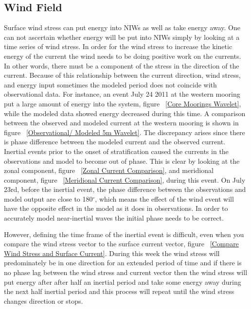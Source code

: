 \subsection{Wind Field}
Surface wind stress can put energy into NIWs as well as take energy away. One can not ascertain whether energy will be put into NIWs simply
by looking at a time series of wind stress. In order for the wind stress to increase the kinetic energy of the current the wind needs to be doing positive work on the currents. 
In other words, there must be a component of the stress in the direction of the current. Because of this relationship between the current direction, wind stress, and energy input sometimes 
the modeled period does not coincide with observational data. For instance, an event July 24 2011 at the western mooring put a large amount of energy into the system, 
figure ~\ref{Core Moorings Wavelet}, while the modeled data showed energy decreased during this time. A comparison between the observed and modeled current at the western mooring
is shown in figure ~\ref{Observational/ Modeled 5m Wavelet}. The discrepancy arises since there is phase difference between the modeled current and the observed current. 
Inertial events prior to the onset of stratification caused the currents in the observations and model to become out of phase. This is clear by looking at the zonal component, 
figure ~\ref{Zonal Current Comparison}, and meridional component, figure ~\ref{Meridional Current Comparison}, during this event. On July 23rd, before the inertial event, the phase 
difference between the observations and model output are close to 180$^{\circ}$, which means the effect of the wind event will have the opposite effect in the model as it does 
in observations. In order to accurately model near-inertial waves the initial phase needs to be correct.



However, defining the time frame of the inertial event is difficult, even when you compare the wind stress vector to the surface current vector, 
figure ~\ref{Compare Wind Stress and Surface Current}. During this week the wind stress will predominately be in one direction for an extended period of time and if
there is no phase lag between the wind stress and current vector then the wind stress will put energy after after half an inertial period and take some energy away during the 
next half inertial period and this process will repeat until the wind stress changes direction or stops. 

